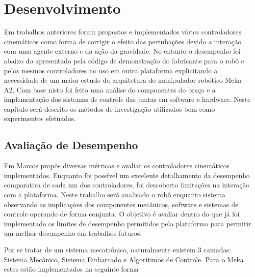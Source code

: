 \chapter{Desenvolvimento\label{ch:develop}}


Em trabalhos anteriores foram propostos e implementados vários controladores cinemáticos como forma de corrigir o efeito das pertubações devido a interação com uma agente externo e da ação da gravidade. No entanto o desempenho foi abaixo do apresentado pela código de demonstração do fabricante para o robô e pelos mesmos controladores no uso em outra plataforma explicitando a necessidade de um maior estudo da arquitetura do manipulador robótico Meka A2. Com base nisto foi feito uma análise do componentes do braço e a implementação dos sistemas de controle das juntas em software e hardware. Neste capítulo será descrito os métodos de investigação utilizados bem como experimentos efetuados.

\section{Avaliação de Desempenho}

Em \cite{nocite} Marcos propôs diversas métricas e avaliar os controladores cinemáticos implementados. Enquanto foi possível um excelente detalhamento da desempenho comparativa de cada um dos controladores, foi descoberto limitações na interação com a plataforma. Neste trabalho será analisado o robô enquanto sistema observando as implicações dos componentes mecânicos, software e sistemas de controle operando de forma conjunta. O objetivo é avaliar dentro do que já foi implementado os limites de desempenho permitidos pela plataforma para permitir um melhor desempenho em trabalhos futuros. 


Por se tratar de um sistema mecatrônico, naturalmente existem 3 camadas: Sistema Mecânico, Sistema Embarcado e Algorítimos de Controle. Para o Meka estes estão implementados na seguinte forma

